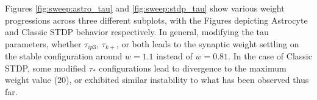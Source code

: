 
Figures \ref{fig:sweep:astro_tau} and \ref{fig:sweep:stdp_tau} show various
weight progressions across three different subplots, with the Figures
depicting Astrocyte and Classic STDP behavior respectively. In general,
modifying the tau parameters, whether $\tau_{ip3}$, $\tau_{k+}$, or both leads
to the synaptic weight settling on the stable configuration around $w=1.1$
instead of $w=0.81$. In the case of Classic STDP, some modified $\tau_*$
configurations lead to divergence to the maximum weight value ($20$), or
exhibited similar instability to what has been observed thus far.



